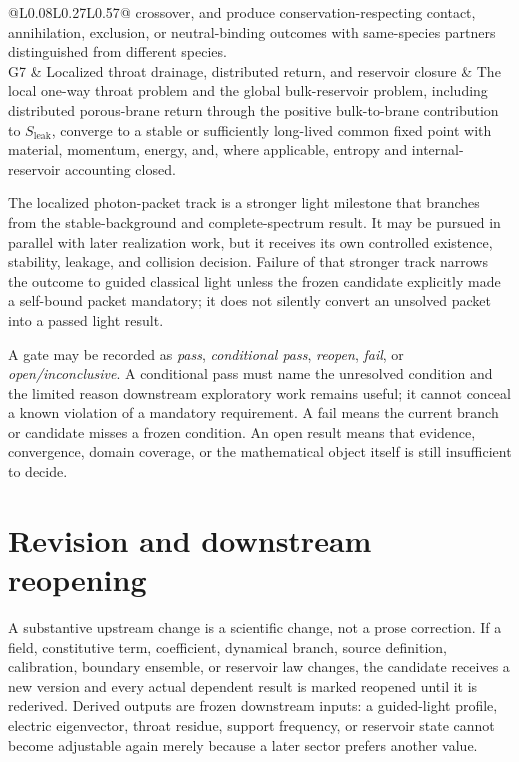 \begin{longtable}{@{}L{0.08\textwidth}L{0.27\textwidth}L{0.57\textwidth}@{}}
  crossover, and produce conservation-respecting contact, annihilation,
  exclusion, or neutral-binding outcomes with same-species partners distinguished
  from different species. \\
\addlinespace
G7
& Localized throat drainage, distributed return, and reservoir closure
& The local one-way throat problem and the global bulk-reservoir problem,
  including distributed porous-brane return through the positive bulk-to-brane
  contribution to \(S_{\mathrm{leak}}\), converge to a stable or sufficiently
  long-lived common fixed point with material, momentum, energy, and, where
  applicable, entropy and internal-reservoir accounting closed. \\
\bottomrule
\end{longtable}
\endgroup

The localized photon-packet track is a stronger light milestone that branches
from the stable-background and complete-spectrum result. It may be pursued in
parallel with later realization work, but it receives its own controlled
existence, stability, leakage, and collision decision. Failure of that stronger
track narrows the outcome to guided classical light unless the frozen candidate
explicitly made a self-bound packet mandatory; it does not silently convert an
unsolved packet into a passed light result.

A gate may be recorded as \emph{pass}, \emph{conditional pass}, \emph{reopen},
\emph{fail}, or \emph{open/inconclusive}. A conditional pass must name the
unresolved condition and the limited reason downstream exploratory work remains
useful; it cannot conceal a known violation of a mandatory requirement. A fail
means the current branch or candidate misses a frozen condition. An open result
means that evidence, convergence, domain coverage, or the mathematical object
itself is still insufficient to decide.

\section{Revision and downstream reopening}

A substantive upstream change is a scientific change, not a prose correction.
If a field, constitutive term, coefficient, dynamical branch, source definition,
calibration, boundary ensemble, or reservoir law changes, the candidate receives
a new version and every actual dependent result is marked reopened until it is
rederived. Derived outputs are frozen downstream inputs: a guided-light profile,
electric eigenvector, throat residue, support frequency, or reservoir state
cannot become adjustable again merely because a later sector prefers another
value.

